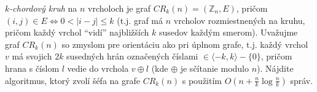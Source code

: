 {\em $k$-chordový kruh} na $n$ vrcholoch je graf $CR_k(n)=({\mathbb Z}_n,E)$, pričom $(i,j)\in E\iff 0<|i-j|\le k$ (t.j. graf má $n$ vrcholov
rozmiestnených na kruhu, pričom každý vrchol ``vidí'' najbližších $k$
susedov každým smerom).  Uvažujme graf $CR_k(n)$ so zmyslom pre orientáciu
ako pri úplnom grafe, t.j. každý vrchol $v$ má svojich $2k$ susedných hrán
označených číslami $\in\langle-k,k\rangle-\{0\}$, pričom hrana s číslom $l$
vedie do vrchola $v\oplus l$ (kde $\oplus$ je sčítanie modulo $n$).
Nájdite algoritmus, ktorý zvolí šéfa na grafe $CR_k(n)$ s použitím
$O\left(n+\frac{n}{k}\log\frac{n}{k}\right)$ správ.

